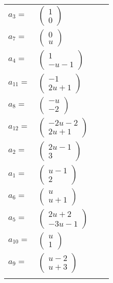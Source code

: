 \documentclass[1p]{elsarticle_modified}
\theoremstyle{definition}
\begin{document}
\begin{tabular}{m{7pt} m{180pt} m{7pt} m{180pt} }
\flushright $a_{3}=$&$\begin{pmatrix}1\\0\end{pmatrix}$ \\
\flushright $a_{7}=$&$\begin{pmatrix}0\\u\end{pmatrix}$ \\
\flushright $a_{4}=$&$\begin{pmatrix}1\\- u-1\end{pmatrix}$ \\
\flushright $a_{11}=$&$\begin{pmatrix}-1\\2 u+1\end{pmatrix}$ \\
\flushright $a_{8}=$&$\begin{pmatrix}- u\\-2\end{pmatrix}$ \\
\flushright $a_{12}=$&$\begin{pmatrix}-2 u-2\\2 u+1\end{pmatrix}$ \\
\flushright $a_{2}=$&$\begin{pmatrix}2 u-1\\3\end{pmatrix}$ \\
\flushright $a_{1}=$&$\begin{pmatrix}u-1\\2\end{pmatrix}$ \\
\flushright $a_{6}=$&$\begin{pmatrix}u\\u+1\end{pmatrix}$ \\
\flushright $a_{5}=$&$\begin{pmatrix}2 u+2\\-3 u-1\end{pmatrix}$ \\
\flushright $a_{10}=$&$\begin{pmatrix}u\\1\end{pmatrix}$ \\
\flushright $a_{9}=$&$\begin{pmatrix}u-2\\u+3\end{pmatrix}$\\&\end{tabular}
\end{document}
